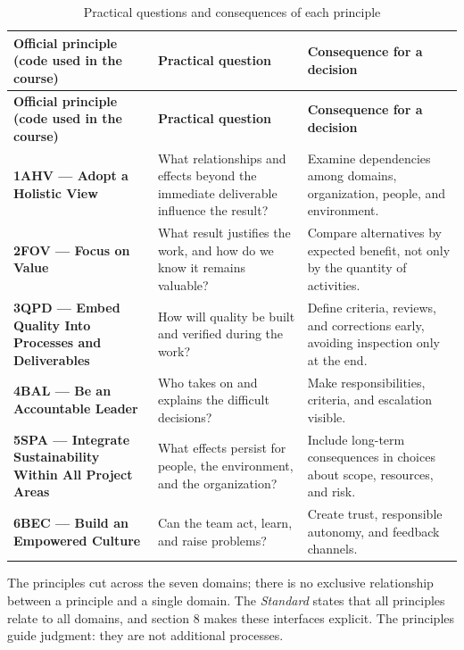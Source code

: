 \documentclass[12pt,a4paper,article,oneside,brazil,english]{abntex2}
\makeatletter
\newcommand{\fontetab}[1]{\par\vspace{3pt}{\small\noindent Source: #1\par}}
\newcommand{\refnum}[1]{\csname refnum@#1\endcsname}
\newcommand{\cit}[1]{[\refnum{#1}]}
\makeatother
\begin{document}
\begingroup\SingleSpacing\small
\begin{longtable}{@{}>{\raggedright\arraybackslash}p{}>{\raggedright\arraybackslash}p{}>{\raggedright\arraybackslash}p{}@{}}
\caption{Practical questions and consequences of each principle}\label{tab:t3}\\
\hline
\textbf{Official principle (code used in the course)} & \textbf{Practical question} & \textbf{Consequence for a decision}\\
\hline
\endfirsthead
\hline
\textbf{Official principle (code used in the course)} & \textbf{Practical question} & \textbf{Consequence for a decision}\\
\hline
\endhead
\hline
\endfoot
\hline
\endlastfoot
\textbf{1AHV — Adopt a Holistic View} & What relationships and effects beyond the immediate deliverable influence the result? & Examine dependencies among domains, organization, people, and environment.\\[3pt]
\textbf{2FOV — Focus on Value} & What result justifies the work, and how do we know it remains valuable? & Compare alternatives by expected benefit, not only by the quantity of activities.\\[3pt]
\textbf{3QPD — Embed Quality Into Processes and Deliverables} & How will quality be built and verified during the work? & Define criteria, reviews, and corrections early, avoiding inspection only at the end.\\[3pt]
\textbf{4BAL — Be an Accountable Leader} & Who takes on and explains the difficult decisions? & Make responsibilities, criteria, and escalation visible.\\[3pt]
\textbf{5SPA — Integrate Sustainability Within All Project Areas} & What effects persist for people, the environment, and the organization? & Include long-term consequences in choices about scope, resources, and risk.\\[3pt]
\textbf{6BEC — Build an Empowered Culture} & Can the team act, learn, and raise problems? & Create trust, responsible autonomy, and feedback channels.\\[3pt]
\end{longtable}
\endgroup
\fontetab{Prepared by the authors (2026), based on \cit{pmi}.}

The principles cut across the seven domains; there is no exclusive relationship between a principle and a single domain. The \textit{Standard} states that all principles relate to all domains, and section 8 makes these interfaces explicit. The principles guide judgment: they are not additional processes.
\end{document}
